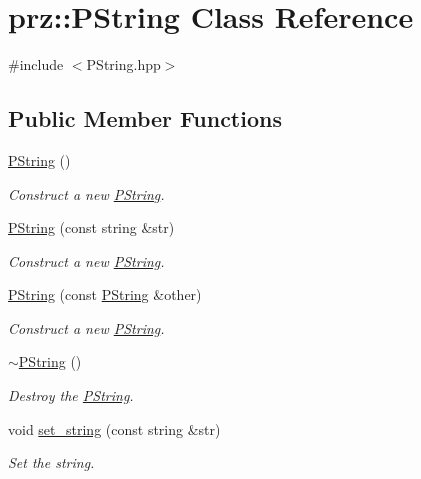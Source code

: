 \hypertarget{classprz_1_1_p_string}{}\section{prz\+::P\+String Class Reference}
\label{classprz_1_1_p_string}


{\ttfamily \#include $<$P\+String.\+hpp$>$}

\subsection*{Public Member Functions}
\begin{DoxyCompactItemize}
\item 
\mbox{\hyperlink{classprz_1_1_p_string_a49c184bdacf058b300fbcbb2f1dabb73}{P\+String}} ()
\begin{DoxyCompactList}\small\item\em Construct a new \mbox{\hyperlink{classprz_1_1_p_string}{P\+String}}. \end{DoxyCompactList}\item 
\mbox{\hyperlink{classprz_1_1_p_string_a49564845487998ce0fe4062df21dd857}{P\+String}} (const string \&str)
\begin{DoxyCompactList}\small\item\em Construct a new \mbox{\hyperlink{classprz_1_1_p_string}{P\+String}}. \end{DoxyCompactList}\item 
\mbox{\hyperlink{classprz_1_1_p_string_ae72acc504d808db97ea7a35db14ff36a}{P\+String}} (const \mbox{\hyperlink{classprz_1_1_p_string}{P\+String}} \&other)
\begin{DoxyCompactList}\small\item\em Construct a new \mbox{\hyperlink{classprz_1_1_p_string}{P\+String}}. \end{DoxyCompactList}\item 
\mbox{\hyperlink{classprz_1_1_p_string_a5859e66659c9db811447d97a9de9e976}{$\sim$\+P\+String}} ()
\begin{DoxyCompactList}\small\item\em Destroy the \mbox{\hyperlink{classprz_1_1_p_string}{P\+String}}. \end{DoxyCompactList}\item 
void \mbox{\hyperlink{classprz_1_1_p_string_afcef04054a81bea83bca47ea3eb2a625}{set\+\_\+string}} (const string \&str)
\begin{DoxyCompactList}\small\item\em Set the string. \end{DoxyCompactList}\item 

\end{DoxyCompactItemize}
